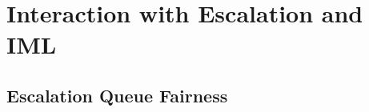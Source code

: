 \documentclass[11pt]{article}
\theoremstyle{plain}
\theoremstyle{definition}
\theoremstyle{remark}
\begin{document}
\section{Interaction with Escalation and IML}
\label{sec:interaction}

%
%
%
%
%
%
%
%

\subsection{Escalation Queue Fairness}
\label{sec:escalation-fair}
\end{document}
